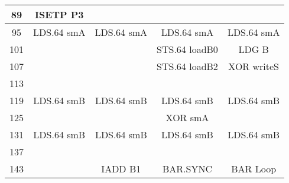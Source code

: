 \begin{table}[htbp]
{\begin{tabular}{|c|c|c|c|c|}
    \hline
    89 &ISETP P3 & & &\\
    \hline
    95 & LDS.64 smA & LDS.64 smA & LDS.64 smA & LDS.64 smA \\
    \hline
    101 & & & STS.64 loadB0 & LDG B \\
    \hline
    107 & & & STS.64 loadB2 & XOR writeS \\
    \hline
    113 & & & & \\
    \hline
    119 & LDS.64 smB & LDS.64 smB & LDS.64 smB & LDS.64 smB \\
    \hline
    125 & & & XOR smA & \\
    \hline
    131 & LDS.64 smB & LDS.64 smB & LDS.64 smB & LDS.64 smB \\
    \hline
    137 & & & & \\
    \hline
    143 & & IADD B1 & BAR.SYNC & BAR Loop \\
    \hline
\end{tabular}
}
\end{table}

